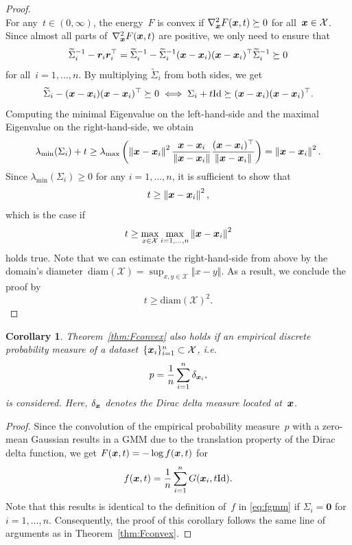 \documentclass{article} %
\theoremstyle{plain}
\newtheorem{corollary}[theorem]{Corollary}
\theoremstyle{definition}
\theoremstyle{remark}
\newcommand{\X}{\mathcal{X}}
\newcommand{\id}{\mathrm{Id}}
\newcommand{\norm}[1]{\left\Vert#1\right\Vert}
\newcommand{\diameter}{\mathrm{diam}}
\begin{document}
\begin{proof}
\[\]
For any~$t\in(0,\infty)$, the energy~$F$ is convex if $\nabla_{\bm{x}}^2 F({\bm{x}}, t)\succeq0$ for all~$\vx\in\X$.
Since almost all parts of~$\nabla_{\bm{x}}^2 F({\bm{x}}, t)$ are positive, we only need to ensure that
\[
\widetilde{\Sigma}_i^{-1} - {\bm{r}}_i{\bm{r}}_i^\top = \widetilde{\Sigma}_i^{-1} - \widetilde{\Sigma}_i^{-1} ({\bm{x}}-{\bm{x}}_i)({\bm{x}}-{\bm{x}}_i)^\top \widetilde{\Sigma}_i^{-1} \succeq 0
\]
for all~$i=1,\ldots,n$.
By multiplying $\widetilde{\Sigma}_i$ from both sides, we get
\[
\widetilde{\Sigma}_i - (\vx-\vx_i)(\vx-\vx_i)^\top \succeq 0 \iff \Sigma_i + t\id \succeq (\vx-\vx_i)(\vx-\vx_i)^\top.
\]
Computing the minimal Eigenvalue on the left-hand-side and the maximal Eigenvalue on the right-hand-side, we obtain
\[
\lambda_\mathrm{min}(\Sigma_i) + t \geq \lambda_\mathrm{max}\left(\norm{\vx-\vx_i}^2 \frac{\vx-\vx_i}{\norm{\vx-\vx_i}}\frac{(\vx-\vx_i)^\top}{\norm{\vx-\vx_i}}\right) = \norm{\vx-\vx_i}^2.
\]
Since $\lambda_\mathrm{min}(\Sigma_i)\geq0$ for any $i=1,\ldots,n$, it is sufficient to show that
\[
t\geq \norm{\vx-\vx_i}^2,
\]
which is the case if 
\[
t\geq \max_{x\in\X}\max_{i=1,\ldots,n} \norm{\vx-\vx_i}^2
\]
holds true.
Note that we can estimate the right-hand-side from above by the domain's diameter~$\diameter(\X)=\sup_{x,y\in\X}\norm{x-y}$.
As a result, we conclude the proof by
\[
t\geq \diameter(\X)^2.
\]
\end{proof}

\begin{corollary}
Theorem~\ref{thm:Fconvex} also holds if an empirical discrete probability measure of a dataset~$\{\vx_i\}_{i=1}^n\subset\X$, i.e.
\[
p = \frac{1}{n}\sum_{i=1}^n\delta_{{\bm{x}}_i},
\]
is considered.
Here, $\delta_{{\bm{x}}}$ denotes the Dirac delta measure located at~${\bm{x}}$.
\end{corollary}

\begin{proof}
Since the convolution of the empirical probability measure~$p$ with a zero-mean Gaussian results in a GMM due to the translation property of the Dirac delta function, we get $F({\bm{x}},t) = -\log f({\bm{x}},t)$ for
\[
f(\vx,t)=\frac{1}{n}\sum_{i=1}^n G(\vx_i, t\id).
\]
Note that this results is identical to the definition of~$f$ in \eqref{eq:fgmm} if $\Sigma_i=\bm{0}$ for $i=1,\ldots,n$.
Consequently, the proof of this corollary follows the same line of arguments as in Theorem~\ref{thm:Fconvex}.
\end{proof}
\end{document}
